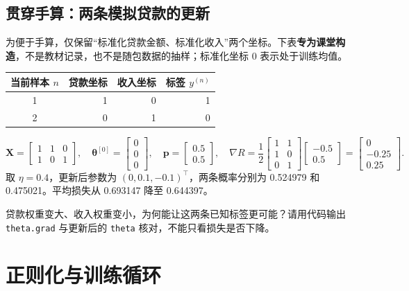 \documentclass[UTF8,a4paper,11pt,fontset=fandol]{ctexart}
\begin{document}
\subsection{贯穿手算：两条模拟贷款的更新}
为便于手算，仅保留“标准化贷款金额、标准化收入”两个坐标。下表\textbf{专为课堂构造}，不是教材记录，也不是随包数据的抽样；标准化坐标 0 表示处于训练均值。
\begin{center}\begin{tabular}{crrr}\toprule
当前样本 $n$ & 贷款坐标 & 收入坐标 & 标签 $y^{(n)}$\\\midrule
1 & 1 & 0 & 1\\2 & 0 & 1 & 0\\\bottomrule\end{tabular}\end{center}
\begin{equation}
\mathbf X=\begin{bmatrix}1&1&0\\1&0&1\end{bmatrix},\quad
\boldsymbol\theta^{[0]}=\begin{bmatrix}0\\0\\0\end{bmatrix},\quad
\mathbf p=\begin{bmatrix}0.5\\0.5\end{bmatrix},\quad
\nabla R=\frac12\begin{bmatrix}1&1\\1&0\\0&1\end{bmatrix}\begin{bmatrix}-0.5\\0.5\end{bmatrix}
=\begin{bmatrix}0\\-0.25\\0.25\end{bmatrix}.
\end{equation}
取 $\eta=0.4$，更新后参数为 $(0,0.1,-0.1)^\top$，两条概率分别为 0.524979 和 0.475021。平均损失从 0.693147 降至 0.644397。
\begin{questionbox}
贷款权重变大、收入权重变小，为何能让这两条已知标签更可能？请用代码输出 \texttt{theta.grad} 与更新后的 \texttt{theta} 核对，不能只看损失是否下降。
\end{questionbox}
\clearpage
\section{正则化与训练循环}
\end{document}
